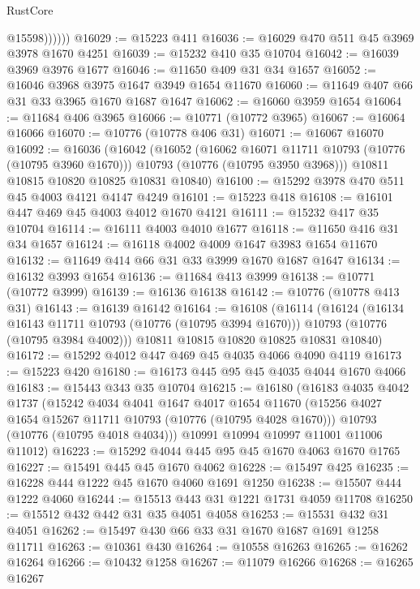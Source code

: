 \begin{lexlean}{RustCore}
\begin{coremodule}
                @15598))))))
@16029 := @15223 @411
@16036 := @16029 @470 @511 @45 @3969 @3978 @1670 @4251
@16039 := @15232 @410 @35 @10704
@16042 := @16039 @3969 @3976 @1677
@16046 := @11650 @409 @31 @34 @1657
@16052 := @16046 @3968 @3975 @1647 @3949 @1654 @11670
@16060 := @11649 @407 @66 @31 @33 @3965 @1670 @1687 @1647
@16062 := @16060 @3959 @1654
@16064 := @11684 @406 @3965
@16066 := @10771 (@10772 @3965)
@16067 := @16064 @16066
@16070 := @10776 (@10778 @406 @31)
@16071 := @16067 @16070
@16092 := @16036
    (@16042
      (@16052
        (@16062 @16071 @11711 @10793 (@10776 (@10795 @3960 @1670)))
        @10793
        (@10776 (@10795 @3950 @3968)))
      @10811
      @10815
      @10820
      @10825
      @10831
      @10840)
@16100 := @15292 @3978 @470 @511 @45 @4003 @4121 @4147 @4249
@16101 := @15223 @418
@16108 := @16101 @447 @469 @45 @4003 @4012 @1670 @4121
@16111 := @15232 @417 @35 @10704
@16114 := @16111 @4003 @4010 @1677
@16118 := @11650 @416 @31 @34 @1657
@16124 := @16118 @4002 @4009 @1647 @3983 @1654 @11670
@16132 := @11649 @414 @66 @31 @33 @3999 @1670 @1687 @1647
@16134 := @16132 @3993 @1654
@16136 := @11684 @413 @3999
@16138 := @10771 (@10772 @3999)
@16139 := @16136 @16138
@16142 := @10776 (@10778 @413 @31)
@16143 := @16139 @16142
@16164 := @16108
    (@16114
      (@16124
        (@16134 @16143 @11711 @10793 (@10776 (@10795 @3994 @1670)))
        @10793
        (@10776 (@10795 @3984 @4002)))
      @10811
      @10815
      @10820
      @10825
      @10831
      @10840)
@16172 := @15292 @4012 @447 @469 @45 @4035 @4066 @4090 @4119
@16173 := @15223 @420
@16180 := @16173 @445 @95 @45 @4035 @4044 @1670 @4066
@16183 := @15443 @343 @35 @10704
@16215 := @16180
    (@16183
      @4035
      @4042
      @1737
      (@15242
        @4034
        @4041
        @1647
        @4017
        @1654
        @11670
        (@15256 @4027 @1654 @15267 @11711 @10793 (@10776 (@10795 @4028 @1670)))
        @10793
        (@10776 (@10795 @4018 @4034)))
      @10991
      @10994
      @10997
      @11001
      @11006
      @11012)
@16223 := @15292 @4044 @445 @95 @45 @1670 @4063 @1670 @1765
@16227 := @15491 @445 @45 @1670 @4062
@16228 := @15497 @425
@16235 := @16228 @444 @1222 @45 @1670 @4060 @1691 @1250
@16238 := @15507 @444 @1222 @4060
@16244 := @15513 @443 @31 @1221 @1731 @4059 @11708
@16250 := @15512 @432 @442 @31 @35 @4051 @4058
@16253 := @15531 @432 @31 @4051
@16262 := @15497 @430 @66 @33 @31 @1670 @1687 @1691 @1258 @11711
@16263 := @10361 @430
@16264 := @10558 @16263
@16265 := @16262 @16264
@16266 := @10432 @1258
@16267 := @11079 @16266
@16268 := @16265 @16267

\end{coremodule}
\end{lexlean}

